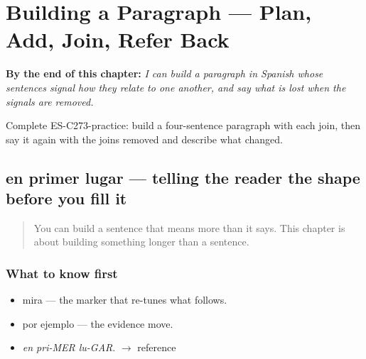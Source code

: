 
\chapter{Building a Paragraph --- Plan, Add, Join, Refer Back}
\label{ch:parrafo}

\begin{chapteropening}
\textbf{By the end of this chapter:} \emph{I can build a paragraph in Spanish whose sentences signal how they relate to one another, and say what is lost when the signals are removed.}

Complete ES-C273-practice: build a four-sentence paragraph with each join, then say it again with the joins removed and describe what changed.
\end{chapteropening}

\section[en primer lugar]{en primer lugar — telling the reader the shape before you fill it}

\label{lesson:ES-C273-en-primer-lugar}



\begin{quote}
You can build a sentence that means more than it says. This chapter is about building something longer than a sentence.
\end{quote}

\subsection*{What to know first}
\begin{itemize}
\raggedright
  \item mira — the marker that re-tunes what follows.
  \item por ejemplo — the evidence move.
\end{itemize}

\begin{sounds}
\begin{itemize}
\raggedright
  \item \emph{en pri-MER lu-GAR}. $\to$ reference
\end{itemize}
\end{sounds}

